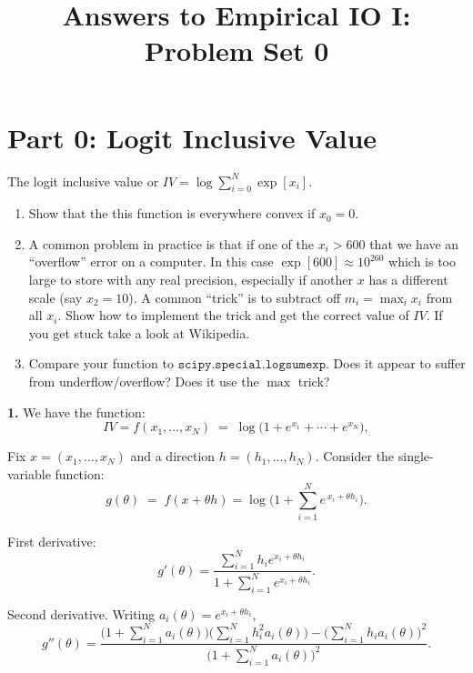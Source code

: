 \documentclass{article}
\begin{document}
\title{Answers to Empirical IO I: Problem Set 0} 
\author{}
\date{}
\maketitle


\section*{Part 0: Logit Inclusive Value}

\begin{tcolorbox}

The logit inclusive value or $IV = \log \sum_{i=0}^N \exp[x_i]$.
\begin{enumerate}
\item Show that the this function is everywhere convex if $x_0=0$.
\item A common problem in practice is that if one of the $x_i > 600$ that we have an ``overflow'' error on a computer. In this case $\exp[600] \approx 10^{260}$ which is too large to store with any real precision, especially if another $x$ has a different scale (say $x_2=10$). A common ``trick'' is to subtract off $m_i = \max_i x_i$ from all $x_i$.  Show how to implement the trick and get the correct value of $IV$. If you get stuck take a look at Wikipedia.
\item Compare your function to $\mathtt{scipy.special.logsumexp}$. Does it appear to suffer from underflow/overflow? Does it use the $\max$ trick?
\end{enumerate}

    \end{tcolorbox}

    \vspace{5mm}

    \textbf{1.} We have the function:
    \[
    IV = f(x_1,\dots,x_N) \;=\; \log\!\Big(1+e^{x_1}+\cdots+e^{x_N}\Big),
    \]
    
    Fix $x=(x_1,\dots,x_N)$ and a direction $h=(h_1,\dots,h_N)$.  
    Consider the single-variable function:
    \[
    g(\theta) \;=\; f(x+\theta h)
    = \log\!\Big(1+\sum_{i=1}^N e^{\,x_i+\theta h_i}\Big).
    \]
    
    First derivative:
    \[
    g'(\theta)
    = \frac{\sum_{i=1}^N h_i e^{x_i+\theta h_i}}
           {1+\sum_{i=1}^N e^{x_i+\theta h_i}}.
    \]
    
    Second derivative. Writing $a_i(\theta)=e^{x_i+\theta h_i}$,
    \[
    g''(\theta)
    = \frac{\Big(1+\sum_{i=1}^N a_i(\theta)\Big)\Big(\sum_{i=1}^N h_i^2 a_i(\theta)\Big)
          -\Big(\sum_{i=1}^N h_i a_i(\theta)\Big)^2}
           {\Big(1+\sum_{i=1}^N a_i(\theta)\Big)^2}.
    \]
    
\end{document}
